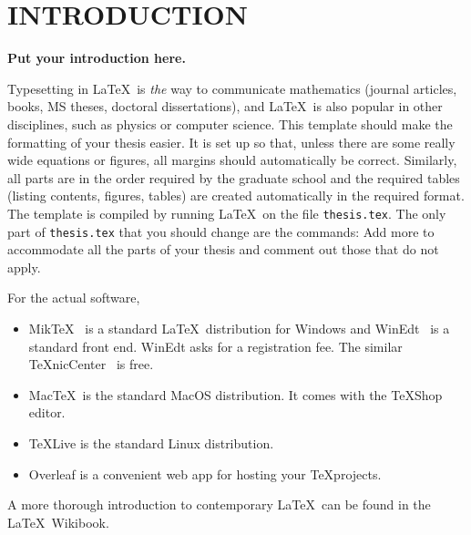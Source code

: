 
\chapter{INTRODUCTION}\label{chap1:introduction}

{\bf Put your introduction here.}


Typesetting in \LaTeX \ is {\em the} way to communicate mathematics
(journal articles, books, MS theses, doctoral dissertations),
and \LaTeX \ is also popular in other disciplines, such as 
physics or computer science. This template should make the formatting
of your thesis easier. It is set up so that, unless there are some really
wide equations or figures, all margins should automatically be correct.
Similarly, all parts are in the order required by the graduate school and 
the required tables (listing contents, figures, tables)
are created automatically in the required format. 
The template is compiled by running \LaTeX \ on 
the file \verb+thesis.tex+. The only part of 
\verb+thesis.tex+ that you should change are the
\verb++ commands: Add more to accommodate all the
parts of your thesis and comment out those that do not apply. 


For the actual software,
\begin{itemize}
	\item Mik\TeX~\cite{MiKTeX}
	is a standard \LaTeX\ distribution for Windows and
	WinEdt~\cite{WinEdt} is a standard front end.
	WinEdt asks for a registration fee. 
	The similar \TeX nicCenter~\cite{TeXnicCenter}
	is free. 
	\item Mac\TeX\ is the standard MacOS distribution.
	It comes with the \TeX Shop editor.
	\item \TeX Live is the standard Linux distribution.
	\item Overleaf is a convenient web app for hosting your
	\TeX projects.
\end{itemize}

A more thorough introduction to contemporary \LaTeX\ can be
found in the \LaTeX\ Wikibook.